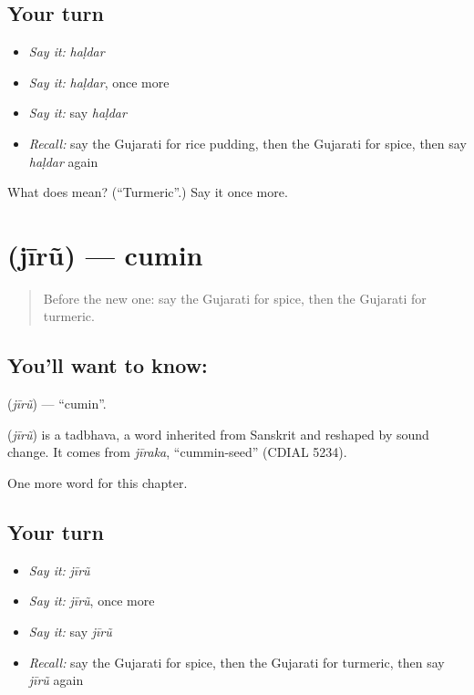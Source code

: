 \subsection*{Your turn}
\begin{itemize}
\raggedright
  \item \emph{Say it:} \emph{haḷdar}
  \item \emph{Say it:} \emph{haḷdar}, once more
  \item \emph{Say it:} say \emph{haḷdar}
  \item \emph{Recall:} say the Gujarati for rice pudding, then the Gujarati for spice, then say \emph{haḷdar} again
\end{itemize}

\begin{tcolorbox}[breakable,colback=teal!4,colframe=teal!35!black,title={Before you move on}]
What does  mean? (\textquotedblleft{}Turmeric\textquotedblright{}.) Say it once more.
\end{tcolorbox}
\section[\texorpdfstring{\gu{જીરું} (jīrũ)}{જીરું (jīrũ)}]{ (jīrũ) — cumin}

\label{lesson:GU-C118-jiru}



\begin{quote}
Before the new one: say the Gujarati for spice, then the Gujarati for turmeric.
\end{quote}

\subsection*{You'll want to know: }
\textbf{} (\emph{jīrũ}) — \textquotedblleft{}cumin\textquotedblright{}.

\begin{cousinweb}
\textbf{} (\emph{jīrũ}) is a tadbhava, a word inherited from Sanskrit and reshaped by sound change. It comes from \emph{jīraka}, \textquotedblleft{}cummin-seed\textquotedblright{} (CDIAL 5234).
\end{cousinweb}

\begin{grammarlens}[title={What you've built}]
One more word for this chapter.
\end{grammarlens}

\subsection*{Your turn}
\begin{itemize}
\raggedright
  \item \emph{Say it:} \emph{jīrũ}
  \item \emph{Say it:} \emph{jīrũ}, once more
  \item \emph{Say it:} say \emph{jīrũ}
  \item \emph{Recall:} say the Gujarati for spice, then the Gujarati for turmeric, then say \emph{jīrũ} again
\end{itemize}

